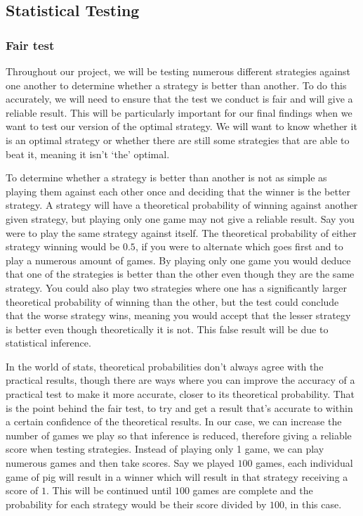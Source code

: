 \documentclass[a4paper,titlepage]{article}
\begin{document}
\subsection{Statistical Testing}
\subsubsection{Fair test}
Throughout our project, we will be testing numerous different strategies against one another to determine whether a strategy is better than another. To do this accurately, we will need to ensure that the test we conduct is fair and will give a reliable result. This will be particularly important for our final findings when we want to test our version of the optimal strategy. We will want to know whether it is an optimal strategy or whether there are still some strategies that are able to beat it, meaning it isn’t `the' optimal.

To determine whether a strategy is better than another is not as simple as playing them against each other once and deciding that the winner is the better strategy. A strategy will have a theoretical probability of winning against another given strategy, but playing only one game may not give a reliable result. Say you were to play the same strategy against itself.  The theoretical probability of either strategy winning would be $0.5$, if you were to alternate which goes first and to play a numerous amount of games. By playing only one game you would deduce that one of the strategies is better than the other even though they are the same strategy. You could also play two strategies where one has a significantly larger theoretical probability of winning than the other, but the test could conclude that the worse strategy wins, meaning you would accept that the lesser strategy is better even though theoretically it is not. This false result will be due to statistical inference.

In the world of stats, theoretical probabilities don’t always agree with the practical results, though there are ways where you can improve the accuracy of a practical test to make it more accurate, closer to its theoretical probability. That is the point behind the fair test, to try and get a result that’s accurate to within a certain confidence of the theoretical results.  In our case, we can increase the number of games we play so that inference is reduced, therefore giving a reliable score when testing strategies.  Instead of playing only 1 game, we can play numerous games and then take scores. Say we played $100$ games, each individual game of pig will result in a winner which will result in that strategy receiving a score of $1$. This will be continued until $100$ games are complete and the probability for each strategy would be their score divided by $100$, in this case.
\end{document}
